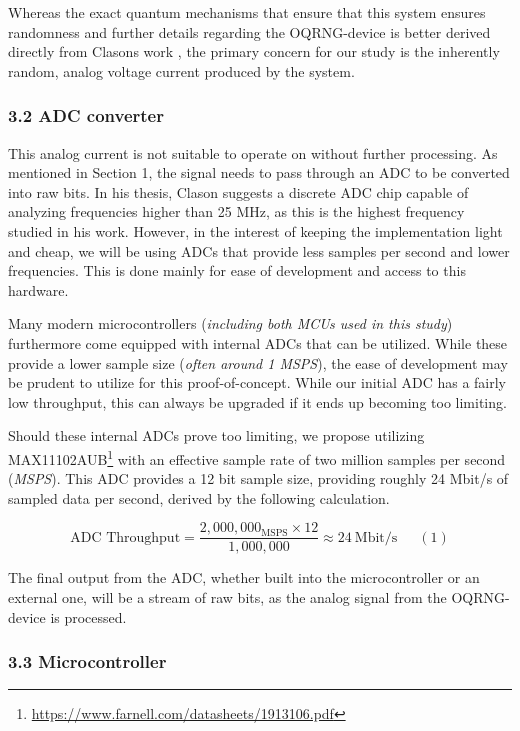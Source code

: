 \documentclass{sigchi}
\begin{document}
Whereas the exact quantum mechanisms that ensure that this system ensures randomness and further details regarding the OQRNG-device is better derived directly from Clasons work \cite{Clason2023}, the primary concern for our study is the inherently random, analog voltage current produced by the system.

\subsubsection{3.2 ADC converter}\label{adc-converter}

This analog current is not suitable to operate on without further processing. As mentioned in Section 1, the signal needs to pass through an ADC to be converted into raw bits. In his thesis, Clason \cite{Clason2023} suggests a discrete ADC chip capable of analyzing frequencies higher than 25 MHz, as this is the highest frequency studied in his work. However, in the interest of keeping the implementation light and cheap, we will be using ADCs that provide less samples per second and lower frequencies. This is done mainly for ease of development and access to this hardware.

Many modern microcontrollers (\emph{including both MCUs used in this study}) furthermore come equipped with internal ADCs that can be utilized. While these provide a lower sample size (\emph{often around 1 MSPS}), the ease of development may be prudent to utilize for this proof-of-concept. While our initial ADC has a fairly low throughput, this can always be upgraded if it ends up becoming too limiting.

Should these internal ADCs prove too limiting, we propose utilizing MAX11102AUB\footnote{\url{https://www.farnell.com/datasheets/1913106.pdf}} with an effective sample rate of two million samples per second (\emph{MSPS}). This ADC provides a 12 bit sample size, providing roughly 24 Mbit/s of sampled data per second, derived by the following calculation.

\[
\text{ADC Throughput}
= \frac{2,000,000_{\mathrm{MSPS}}\times12}{1,000,000}
\approx24\ \mathrm{Mbit/s}\phantom{123}(1)
\]

The final output from the ADC, whether built into the microcontroller or an external one, will be a stream of raw bits, as the analog signal from the OQRNG-device is processed.

\subsubsection{3.3 Microcontroller}\label{microcontroller}
\end{document}
